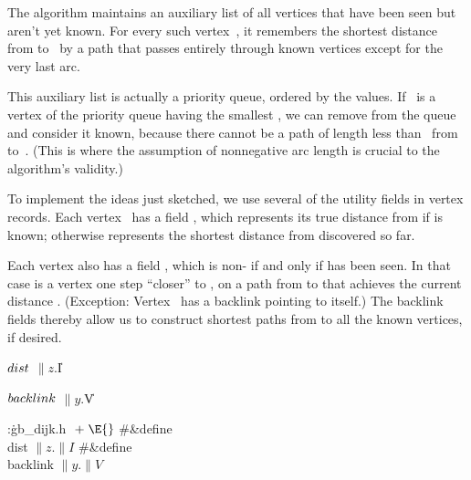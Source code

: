 The algorithm maintains an auxiliary list of all vertices that have been
seen but aren't yet known. For every such vertex~, it remembers
the shortest distance~ from  to~ by a path that
passes entirely
through known vertices except for the very last arc.

This auxiliary list is actually a priority queue, ordered by the 
values.
If ~is a vertex of the priority queue having the smallest , we
can
remove  from the queue and consider it known, because there cannot be
a path of length less than~ from  to~. (This is
where the
assumption of nonnegative arc length is crucial to the algorithm's validity.)

\fi

To implement the ideas just sketched, we use several of the utility
fields in vertex records. Each vertex~ has a  field ,
which represents its true distance from  if  is known;
otherwise
 represents the shortest distance from 
discovered so far.

Each vertex  also has a  field , which is non-\PB{$\NULL$}
if and only if  has been seen. In that case 
is a vertex one
step ``closer'' to , on a path from  to  that
achieves the
current distance . (Exception:
Vertex~ has a backlink pointing to itself.) The backlink
fields thereby allow us to construct shortest paths from  to all the
known vertices, if desired.

\Y\B\4\D$\\{dist}$ \5
$\|z.{}$\|I\par
\B\4\D$\\{backlink}$ \5
$\|y.{}$\|V%
\par
\Y\B\4:\.{gb\_dijk.h }\X${}\mathrel+\E{}$\6
\8\#\&{define} \\{dist} \5${}\|z.\|I{}$\6
\8\#\&{define} \\{backlink} \5${}\|y.\|V{}$\par
\fi

